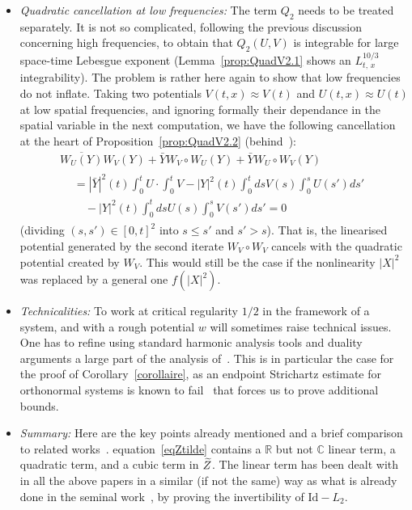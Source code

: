 \documentclass[10pt]{amsart}
\theoremstyle{definition}\newtheorem{defi}[theo]{Definition}\newtheorem{rema}[theo]{Remark}\newtheorem{exam}[theo]{Example}\newtheorem{exem}[theo]{Example}\newtheorem{nota}[theo]{Notation}
\newcommand{\R}{\mathbb{R}}
\newcommand{\C}{\mathbb{C}}
\newcommand{\Id}{\mathrm{Id}}
\let\oldtilde\tilde
\renewcommand*{\tilde}[1]{\mathchoice{\widetilde{#1}}{\widetilde{#1}}{\oldtilde{#1}}{\oldtilde{#1}}}
\begin{document}
\begin{itemize}
\item \emph{Quadratic cancellation at low frequencies:} The term $Q_2$ needs to be treated separately. It is not so complicated, following the previous discussion concerning high frequencies, to obtain that $Q_2(U,V)$ is integrable for large space-time Lebesgue exponent (Lemma~\ref{prop:QuadV2.1} shows an $L^{10/3}_{t,\,x}$ integrability). The problem is rather here again to show that low frequencies do not inflate. Taking two potentials $V(t,x)\approx V(t)$ and $U(t,x)\approx U(t)$ at low spatial frequencies, and ignoring formally their dependance in the spatial variable in the next computation, we have the following cancellation at the heart of Proposition~\ref{prop:QuadV2.2} (behind~\cite[Proposition~4]{lewsab2}):
\begin{multline*}
\overline{W_U(Y)}W_V(Y)+\bar YW_V\circ W_U (Y)+\bar YW_U\circ W_V (Y)\\
\begin{aligned}
&= |\bar Y|^2(t)\int_0^tU \cdot \int_0^t V-|Y|^2(t) \int_0^tds V(s)\int_0^sU(s')ds'\\
&\quad -|Y|^2(t) \int_0^tds U(s)\int_0^sV(s')ds'=0
\end{aligned}
\end{multline*}
(dividing $(s,s')\in [0,t]^2$ into $s\leq s'$ and $s'>s$). That is, the linearised potential generated by the second iterate $W_V\circ W_V$ cancels with the quadratic potential created by $W_V$. This would still be the case if the nonlinearity $|X|^2$ was replaced by a general one $f(|X|^2)$.

\item \emph{Technicalities:} To work at critical regularity $1/2$ in the framework of a system, and with a rough potential $w$ will sometimes raise technical issues. One has to refine using standard harmonic analysis tools and duality arguments a large part of the analysis of~\cite{CodS,lewsab2}. This is in particular the case for the proof of Corollary~\ref{corollaire}, as an endpoint Strichartz estimate for orthonormal systems is known to fail~\cite{FLLS,FS} that forces us to prove additional bounds.


\item \emph{Summary:} Here are the key points already mentioned and a brief comparison to related works~\cite{CHP2,CodS,lewsab2}. equation~\eqref{eqZtilde} contains a $\R$ but not $\C$ linear term, a quadratic term, and a cubic term in $\tilde Z$. The linear term has been dealt with in all the above papers in a similar (if not the same) way as what is already done in the seminal work~\cite{lewsab2}, by proving the invertibility of $\Id - L_2$.
\end{itemize}
\end{document}
